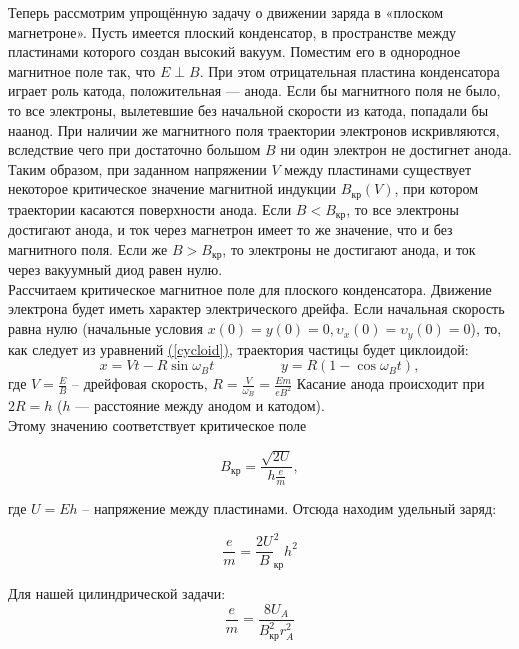 \documentclass[a4paper]{article}
\begin{document}
Теперь рассмотрим упрощённую задачу о движении заряда в «плоском магнетроне». Пусть имеется
плоский конденсатор, в пространстве между пластинами которого со­здан высокий вакуум. Поместим его в однородное
магнитное поле так, что $E\perp B$. При этом отрицательная пластина конденсатора играет роль катода,
положительная — анода. Если бы магнитного поля не было, то все электроны, вылетевшие без начальной скорости из катода, попадали бы наанод. При наличии же магнитного поля траектории электронов искривляются, вследствие чего при достаточно большом $B$ ни один электрон не достигнет анода. Таким образом, при заданном напряжении $V$ между
пластинами существует некоторое критическое значение магнитной индукции $B_{\text{кр}}(V)$, при котором траектории касаются поверхности анода. Если  $B<B_{\text{кр}}$, то все электроны достигают анода, и ток через магнетрон
имеет то же значение, что и без магнитного поля. Если же $B>B_{\text{кр}}$, то электроны не достигают анода, и ток через вакуумный диод равен нулю.\\
Рассчитаем критическое магнитное поле для плоского конденсатора. Движение электрона будет иметь характер электрического дрейфа. Если начальная скорость равна нулю (начальные условия $x(0) = y(0) = 0, \upsilon_x(0) = \upsilon_y(0) = 0$), то, как следует из уравнений \hyperref[cycloid]{(\ref{cycloid})}, траектория частицы будет циклоидой:
\[x = Vt - R\sin{\omega_B t} \hspace{2cm} y = R\left(1-\cos{\omega_B t}\right),\]где $V = \frac{E}{B}$ -- дрейфовая скорость, $R = \frac{V}{\omega_B} = \frac{Em}{eB^2}$ Касание
анода происходит при $2R = h$ ($h$ — расстояние между анодом и катодом).\\
Этому значению соответствует критическое поле

\begin{equation}\label{B_cr}
B_{\text{кр}} = \frac{\sqrt{2U}}{h\frac{e}{m}},
\end{equation}

где $U = Eh$ -- напряжение между пластинами. Отсюда находим удельный заряд:

\begin{equation}\label{RivMass}
\frac{e}{m} = \frac{2U}{B}_{\text{кр}}^2h^2
\end{equation}

Для нашей цилиндрической задачи:
\begin{equation}\label{RealMsss}
\frac{e}{m} = \frac{8 U_A}{B_{\text{кр}}^2 r_A^2}
\end{equation}
\end{document}
